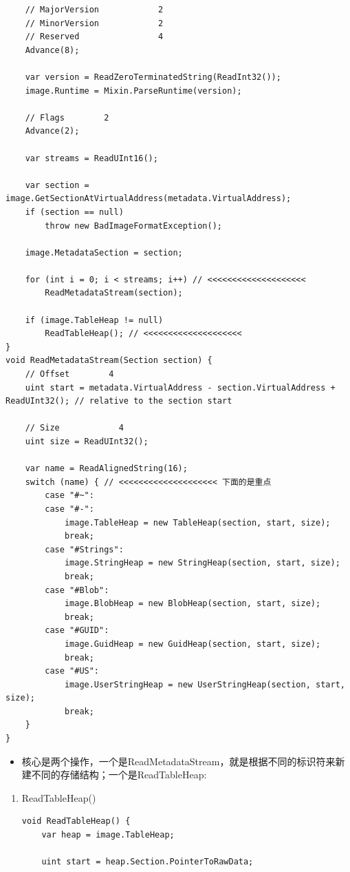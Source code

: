 \documentclass[9pt, b5paper]{article}
\begin{document}
\begin{enumerate}
\begin{enumerate}
\begin{enumerate}
\begin{verbatim}
    // MajorVersion            2
    // MinorVersion            2
    // Reserved                4
    Advance(8);

    var version = ReadZeroTerminatedString(ReadInt32());
    image.Runtime = Mixin.ParseRuntime(version);

    // Flags        2
    Advance(2);

    var streams = ReadUInt16();

    var section = image.GetSectionAtVirtualAddress(metadata.VirtualAddress);
    if (section == null)
        throw new BadImageFormatException();

    image.MetadataSection = section;

    for (int i = 0; i < streams; i++) // <<<<<<<<<<<<<<<<<<<< 
        ReadMetadataStream(section);

    if (image.TableHeap != null)
        ReadTableHeap(); // <<<<<<<<<<<<<<<<<<<< 
}
void ReadMetadataStream(Section section) {
    // Offset        4
    uint start = metadata.VirtualAddress - section.VirtualAddress + ReadUInt32(); // relative to the section start

    // Size            4
    uint size = ReadUInt32();

    var name = ReadAlignedString(16);
    switch (name) { // <<<<<<<<<<<<<<<<<<<< 下面的是重点
        case "#~":
        case "#-":
            image.TableHeap = new TableHeap(section, start, size);
            break;
        case "#Strings":
            image.StringHeap = new StringHeap(section, start, size);
            break;
        case "#Blob":
            image.BlobHeap = new BlobHeap(section, start, size);
            break;
        case "#GUID":
            image.GuidHeap = new GuidHeap(section, start, size);
            break;
        case "#US":
            image.UserStringHeap = new UserStringHeap(section, start, size);
            break;
    }
}
\end{verbatim}
\begin{itemize}
\item 核心是两个操作，一个是ReadMetadataStream，就是根据不同的标识符来新建不同的存储结构；一个是ReadTableHeap:
\end{itemize}
\begin{enumerate}
\item ReadTableHeap()
\label{sec-9-1-3-1-3-4-1}
\begin{verbatim}
void ReadTableHeap() {
    var heap = image.TableHeap;

    uint start = heap.Section.PointerToRawData;


\end{verbatim}
\end{enumerate}
\end{enumerate}
\end{enumerate}
\end{enumerate}
\end{document}
